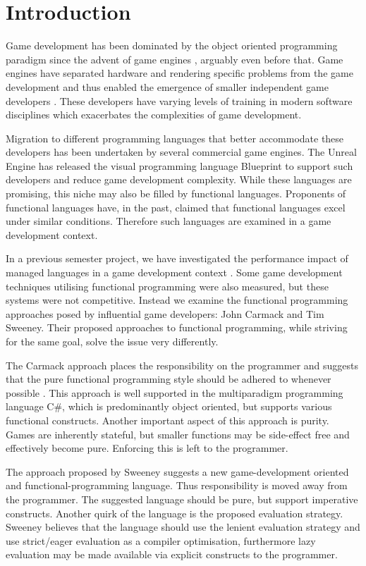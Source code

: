 \chapter{Introduction}
Game development has been dominated by the object oriented programming paradigm since the advent of game engines \cite{anderson@2011:scripting-classes}, arguably even before that. Game engines have separated hardware and rendering specific problems from the game development and thus enabled the emergence of smaller independent game developers \cite{michael2003indie}. These developers have varying levels of training in modern software disciplines\cite{mcgill2009defining, hewner2010game} which exacerbates the complexities of game development\cite{blow2004game}.

Migration to different programming languages that better accommodate these developers has been undertaken by several commercial game engines\needcite. The Unreal Engine has released the visual programming language Blueprint to support such developers and reduce game development complexity\needcite. While these languages are promising, this niche may also be filled by functional languages. Proponents of functional languages have, in the past, claimed that functional languages excel under similar conditions\cite{kemerer2009impact, hughes1989functional, hu2015functional}. Therefore such languages are examined in a game development context.  

In a previous semester project, we have investigated the performance impact of managed languages in a game development context \cite{p92018gameplay}. Some game development techniques utilising functional programming were also measured, but these systems were not competitive. Instead we examine the functional programming approaches posed by influential game developers: John Carmack and Tim Sweeney. Their proposed approaches to functional programming, while striving for the same goal, solve the issue very differently.

The Carmack approach places the responsibility on the programmer and suggests that the pure functional programming style should be adhered to whenever possible \cite{gamasutra:c++functional}. This approach is well supported in the multiparadigm programming language C\#, which is predominantly object oriented, but supports various functional constructs\needcite. Another important aspect of this approach is purity. Games are inherently stateful\needcite, but smaller functions may be side-effect free and effectively become pure. Enforcing this is left to the programmer.

The approach proposed by Sweeney suggests a new game-development oriented and functional-programming language\cite{theNextMainstreanProgrammingLanguage}. Thus responsibility is moved away from the programmer. The suggested language should be pure, but support imperative constructs. Another quirk of the language is the proposed evaluation strategy. Sweeney believes that the language should use the lenient evaluation strategy and use strict/eager evaluation as a compiler optimisation, furthermore lazy evaluation may be made available via explicit constructs to the programmer.


